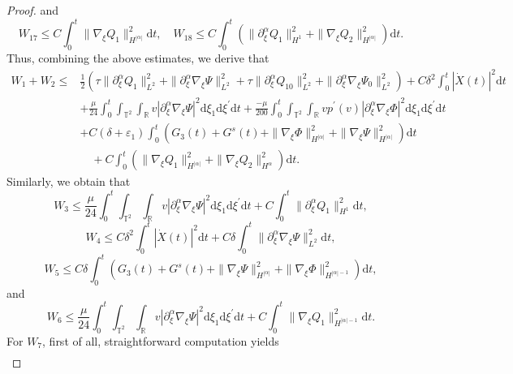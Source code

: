 \documentclass[10pt,a4paper]{amsart}
\newcommand{\dif}{\mathrm{d}}
\begin{document}
\begin{proof}
and
\[
 W_{17} \le C\int_0^t\|\nabla_\xi Q_1\|_{H^{|\alpha|}}^2\dif t,
 \quad
  W_{18} \le C\int_0^t\left(\|\partial_\xi^\alpha Q_1\|_{H^1}^2+\|\nabla_\xi Q_2\|_{H^{|\alpha|}}^2\right)\dif t.
\]
Thus, combining the above estimates, we derive that
\begin{equation}\label{w1}
\begin{aligned}
W_1+W_2\le& \frac{1}{2}\left(\tau\|\partial_\xi^\alpha Q_{1}\|_{L^2}^2+\|\partial_\xi^\alpha\nabla_\xi\Psi\|_{L^2}^2
+\tau\|\partial_\xi^\alpha Q_{10}\|_{L^2}^2+\|\partial_\xi^\alpha\nabla_\xi\Psi_0\|_{L^2}^2\right)
+C\delta^2\int_0^t|\dot X(t)|^2\dif t\\
&
+\frac{\mu}{24}\int_0^t\int_{\mathbb{T}^2}\int_{\mathbb{R}}v|\partial_\xi^\alpha\nabla_\xi\Psi|^2\dif \xi_1\dif \xi^{\prime}\dif t
+\frac{-\mu}{200}\int_0^t\int_{\mathbb{T}^2}\int_{\mathbb{R}}vp^\prime(v)|\partial_\xi^\alpha\nabla_\xi\Phi|^2\dif \xi_1\dif \xi^{\prime}\dif t\\
&+C(\delta+\varepsilon_1)\int_0^t\left(G_3(t)+G^s(t)+\|\nabla_\xi \Phi\|_{H^{|\alpha|}}^2+\|\nabla_\xi \Psi\|_{H^{|\alpha|}}^2\right)\dif t\\
&\quad+C\int_0^t\left(\|\nabla_\xi Q_1\|_{H^{|\alpha|}}^2+\|\nabla_\xi Q_2\|_{H^{\alpha}}^2\right)\dif t.
\end{aligned}
\end{equation}
Similarly, we obtain that
\begin{equation}\label{w3}
W_3\le \frac{\mu}{24}\int_0^t\int_{\mathbb{T}^2}\int_{\mathbb{R}}v|\partial_\xi^\alpha\nabla_\xi\Psi|^2\dif \xi_1\dif \xi^{\prime}\dif t
+C\int_0^t\|\partial_\xi^\alpha Q_1\|_{H^{1}}^2\dif t,
\end{equation}
\begin{equation}\label{w4}
W_4\le C\delta^2\int_0^t|\dot X(t)|^2\dif t+C\delta\int_0^t\|\partial_\xi^\alpha\nabla_\xi \Psi\|_{L^2}^2\dif t,
\end{equation}
\begin{equation}\label{w5}
W_5\le  C\delta\int_0^t\left(G_3(t)+G^s(t)
+\|\nabla_\xi\Psi\|_{H^{|\alpha|}}^2+\|\nabla_\xi\Phi\|_{H^{|\alpha|-1}}^2\right)\dif t,
\end{equation}
and
\begin{equation}\label{w6}
W_6\le \frac{\mu}{24}\int_0^t\int_{\mathbb{T}^2}\int_{\mathbb{R}}v|\partial_\xi^\alpha\nabla_\xi\Psi|^2\dif \xi_1\dif \xi^{\prime}\dif t
+C\int_0^t\|\nabla_\xi Q_1\|_{H^{|\alpha|-1}}^2\dif t.
\end{equation}
For $W_7$, first of all, straightforward computation yields
\begin{align*}

\end{align*}
\end{proof}
\end{document}
